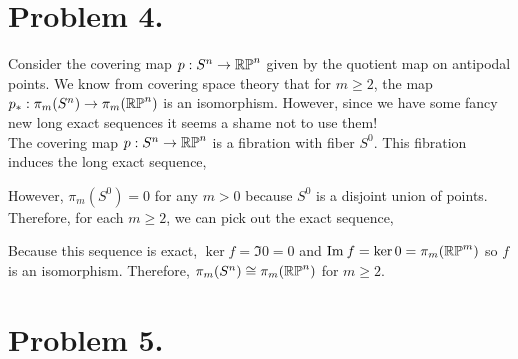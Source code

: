 \documentclass[12pt]{extarticle}
\begin{document}
\section*{Problem 4.}
Consider the covering map $p : S^n \to \mathbb{RP}^n$ given by the quotient map on antipodal points. We know from covering space theory that for $m \ge 2$, the map $p_* : \pi_m(S^n) \to \pi_m(\mathbb{RP}^n)$ is an isomorphism. However, since we have some fancy new long exact sequences it seems a shame not to use them! \bigskip\\
The covering map $p : S^n \to \mathbb{RP}^n$ is a fibration with fiber $S^0$. This fibration induces the long exact sequence,
\begin{center}
\end{center}
However, $\pi_m(S^0) = 0$ for any $m > 0$ because $S^0$ is a disjoint union of points. Therefore, for each $m \ge 2$, we can pick out the exact sequence,
\begin{center}
\end{center}
Because this sequence is exact, $\ker{f} = \Im{0} = 0$ and $\mathrm{Im} \: f = \ker{0} = \pi_m(\mathbb{RP}^m)$ so $f$ is an isomorphism. Therefore, $\pi_m(S^n) \cong \pi_m(\mathbb{RP}^n)$ for $m \ge 2$.

\section*{Problem 5.}
\end{document}
